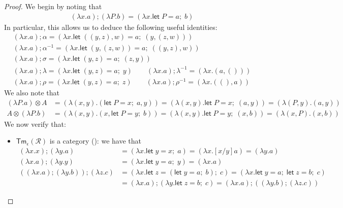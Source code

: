 \documentclass[acmsmall,screen,review]{acmart}
\newcommand{\mc}[1]{\ensuremath{\mathcal{#1}}}
\newcommand{\ms}[1]{\ensuremath{\mathsf{#1}}}
\newcommand{\letexpr}[3]{\ensuremath{\ms{let}\;#1 = #2;\;#3}}
\newcommand{\cmark}{\ding{51}}%
\begin{document}
\begin{proof}
We begin by noting that
\begin{gather*}
  (\lambda x . a) ; (\lambda P . b) = (\lambda x . \letexpr{P}{a}{b})
\end{gather*}
In particular, this allows us to deduce the following useful identities:
\begin{gather*}
  (\lambda x. a) ; \alpha = (\lambda x. \letexpr{((y, z), w)}{a}{(y, (z, w))}) \\
  (\lambda x. a) ; \alpha^{-1} = (\lambda x. \letexpr{(y, (z, w))}{a}{((y, z), w)}) \\
  (\lambda x. a) ; \sigma = (\lambda x. \letexpr{(y, z)}{a}{(z, y)}) \\
  (\lambda x. a) ; \lambda = (\lambda x. \letexpr{(y, z)}{a}{y}) \qquad
  (\lambda x. a) ; \lambda^{-1} = (\lambda x. (a, ())) \\
  (\lambda x. a) ; \rho = (\lambda x. \letexpr{(y, z)}{a}{z}) \qquad
  (\lambda x. a) ; \rho^{-1} = (\lambda x. ((), a))
\end{gather*}
We also note that
\begin{align*}
  (\lambda P . a) \otimes A 
    &= (\lambda (x, y) . (\letexpr{P}{x}{a}, y))
    = (\lambda (x, y) . \letexpr{P}{x}{(a, y)})
    = (\lambda (P, y) . (a, y)) \\
  A \otimes (\lambda P . b)
    &= (\lambda (x, y) . (x, \letexpr{P}{y}{b}))
    = (\lambda (x, y) . \letexpr{P}{y}{(x, b)})
    = (\lambda (x, P) . (x, b))
\end{align*}
We now verify that:
\begin{itemize}
  \item $\ms{Tm}_\epsilon(\mc{R})$ is a category (\cmark): we have that
  \begin{align*}
    (\lambda x . x) ; (\lambda y . a) &= (\lambda x . \letexpr{y}{x}{a}) 
    = (\lambda x . [x/y]a) = (\lambda y . a) \\
    (\lambda x . a) ; (\lambda y . y) &= (\lambda x . \letexpr{y}{a}{y}) = (\lambda x . a) \\
    ((\lambda x . a) ; (\lambda y . b)) ; (\lambda z . c)
    &= (\lambda x . \letexpr{z}{(\letexpr{y}{a}{b})}{c})
    = (\lambda x . \letexpr{y}{a}{\letexpr{z}{b}{c}}) \\
    &= (\lambda x . a) ; (\lambda y . \letexpr{z}{b}{c})
    = (\lambda x . a) ; ((\lambda y . b) ; (\lambda z . c))

\end{align*}
\end{itemize}
\end{proof}
\end{document}
